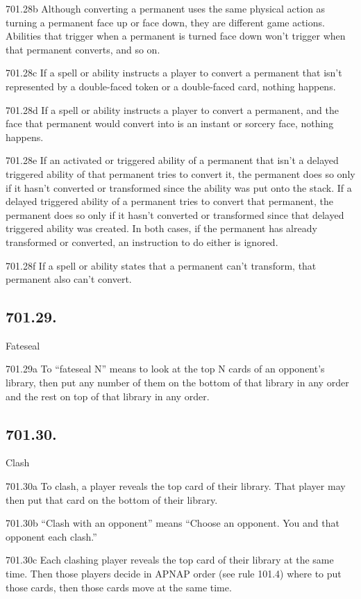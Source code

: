 701.28b Although converting a permanent uses the same physical action as turning a permanent face up or face down, they are different game actions. Abilities that trigger when a permanent is turned face down won’t trigger when that permanent converts, and so on.

701.28c If a spell or ability instructs a player to convert a permanent that isn’t represented by a double-faced token or a double-faced card, nothing happens.

701.28d If a spell or ability instructs a player to convert a permanent, and the face that permanent would convert into is an instant or sorcery face, nothing happens.

701.28e If an activated or triggered ability of a permanent that isn’t a delayed triggered ability of that permanent tries to convert it, the permanent does so only if it hasn’t converted or transformed since the ability was put onto the stack. If a delayed triggered ability of a permanent tries to convert that permanent, the permanent does so only if it hasn’t converted or transformed since that delayed triggered ability was created. In both cases, if the permanent has already transformed or converted, an instruction to do either is ignored.

701.28f If a spell or ability states that a permanent can’t transform, that permanent also can’t convert.

\subsection*{701.29.}
Fateseal

701.29a To “fateseal N” means to look at the top N cards of an opponent’s library, then put any number of them on the bottom of that library in any order and the rest on top of that library in any order.

\subsection*{701.30.}
Clash

701.30a To clash, a player reveals the top card of their library. That player may then put that card on the bottom of their library.

701.30b “Clash with an opponent” means “Choose an opponent. You and that opponent each clash.”

701.30c Each clashing player reveals the top card of their library at the same time. Then those players decide in APNAP order (see rule 101.4) where to put those cards, then those cards move at the same time.

